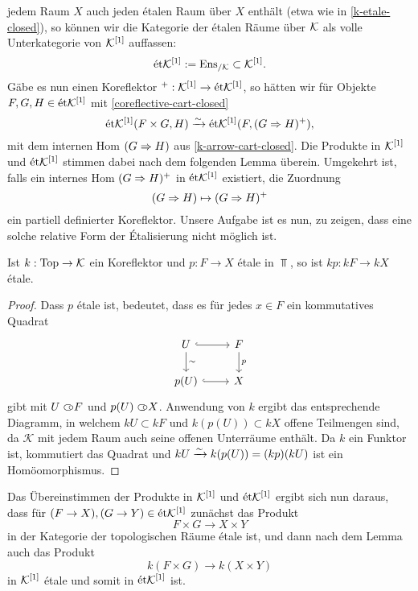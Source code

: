 jedem Raum $X$ auch jeden étalen Raum über $X$ enthält (etwa wie in
\ref{k-etale-closed}), so können wir die Kategorie der étalen Räume
über $\mathcal{K}$ als volle Unterkategorie von $\mathcal{K}^{[1]}$ auffassen:
\[ \mathrm{\acute{e}t} \mathcal{K}^{[1]} := \operatorname{Ens}_{/\mathcal{K}} \subset \mathcal{K}^{[1]}. \]
Gäbe es nun einen Koreflektor $^+: \mathcal{K}^{[1]} \to \mathrm{\acute{e}t} \mathcal{K}^{[1]}$, so
hätten wir für Objekte $F, G, H \in \mathrm{\acute{e}t} \mathcal{K}^{[1]}$ mit
\ref{coreflective-cart-closed}
\[ \mathrm{\acute{e}t} \mathcal{K}^{[1]}(F \times G, H)
  \xrightarrow[]{\sim} \mathrm{\acute{e}t} \mathcal{K}^{[1]}(F, (G \Rightarrow H)^+),
\]
mit dem internen Hom $(G \Rightarrow H)$ aus \ref{k-arrow-cart-closed}. Die
Produkte in $\mathcal{K}^{[1]}$ und $\mathrm{\acute{e}t} \mathcal{K}^{[1]}$ stimmen dabei nach dem
folgenden Lemma überein. Umgekehrt ist, falls ein internes Hom $(G
\Rightarrow H)^+$ in $\mathrm{\acute{e}t} \mathcal{K}^{[1]}$ existiert, die Zuordnung
\[ (G \Rightarrow H) \mapsto (G \Rightarrow H)^+ \]
ein partiell definierter Koreflektor. Unsere Aufgabe ist es nun, zu
zeigen, dass eine solche relative Form der Étalisierung nicht möglich
ist.
\begin{lemma}
  Ist $k: \operatorname{Top} \to \mathcal{K}$ ein Koreflektor und $p: F \to X$ étale in
  $\Top$, so ist $kp: kF \to kX$ étale.
\end{lemma}
\begin{proof}
  Dass $p$ étale ist, bedeutet, dass es für jedes $x \in F$ ein
  kommutatives Quadrat
  \[ 
  \begin{tikzcd}
    U \dar{\sim} \rar[hook] & F \dar{p} \\
    p(U) \rar[hook] & X
  \end{tikzcd}
  \]
  gibt mit $U \subset\kern-0.58em\circ F$ und $p(U) \subset\kern-0.58em\circ X$. Anwendung von $k$ ergibt
  das entsprechende Diagramm, in welchem $kU \subset kF$ und $k(p(U))
  \subset kX$ offene Teilmengen sind, da $\mathcal{K}$ mit jedem Raum
  auch seine offenen Unterräume enthält. Da $k$ ein Funktor ist,
  kommutiert das Quadrat und $kU \xrightarrow[]{\sim} k(p(U)) = (kp)(kU)$ ist ein
  Homöomorphismus.
\end{proof}
Das Übereinstimmen der Produkte in $\mathcal{K}^{[1]}$ und $\mathrm{\acute{e}t} \mathcal{K}^{[1]}$ ergibt sich
nun daraus, dass für $(F \to X), (G \to Y) \in \mathrm{\acute{e}t} \mathcal{K}^{[1]}$ zunächst das
Produkt
\[ F \times G \to X \times Y \]
in der Kategorie der topologischen Räume étale ist, und dann nach dem
Lemma auch das Produkt
\[ k(F \times G) \to k(X \times Y) \]
in $\mathcal{K}^{[1]}$ étale und somit in $\mathrm{\acute{e}t} \mathcal{K}^{[1]}$ ist.


